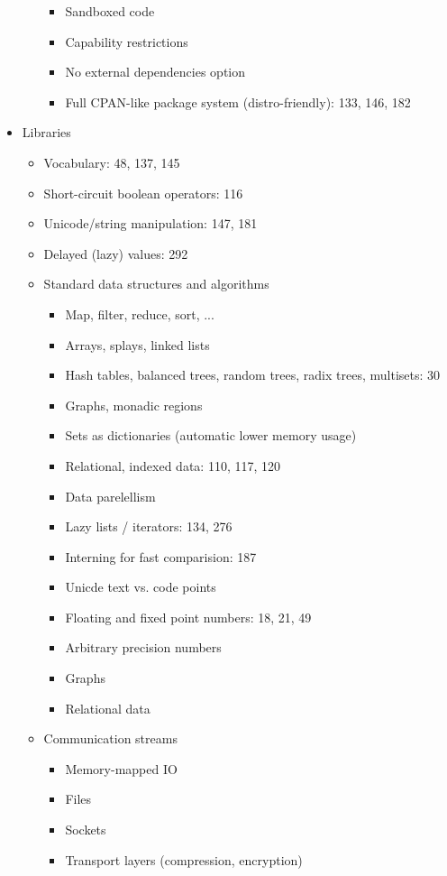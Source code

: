 \begin{itemize}
\begin{itemize}
\begin{itemize}
    \item Sandboxed code
    \item Capability restrictions
    \item No external dependencies option
    \item Full CPAN-like package system (distro-friendly): 133, 146, 182
    \end{itemize}
  \end{itemize}
\item Libraries
  \begin{itemize}
  \item Vocabulary: 48, 137, 145
  \item Short-circuit boolean operators: 116
  \item Unicode/string manipulation: 147, 181
  \item Delayed (lazy) values: 292
  \item Standard data structures and algorithms
    \begin{itemize}
    \item Map, filter, reduce, sort, ...
    \item Arrays, splays, linked lists
    \item Hash tables, balanced trees, random trees, radix trees, multisets: 30
    \item Graphs, monadic regions
    \item Sets as dictionaries (automatic lower memory usage)
    \item Relational, indexed data: 110, 117, 120
    \item Data parelellism
    \item Lazy lists / iterators: 134, 276
    \item Interning for fast comparision: 187
    \item Unicde text vs. code points
    \item Floating and fixed point numbers: 18, 21, 49
    \item Arbitrary precision numbers
    \item Graphs
    \item Relational data
    \end{itemize}
  \item Communication streams
    \begin{itemize}
    \item Memory-mapped IO
    \item Files
    \item Sockets
    \item Transport layers (compression, encryption)

\end{itemize}
\end{itemize}
\end{itemize}

